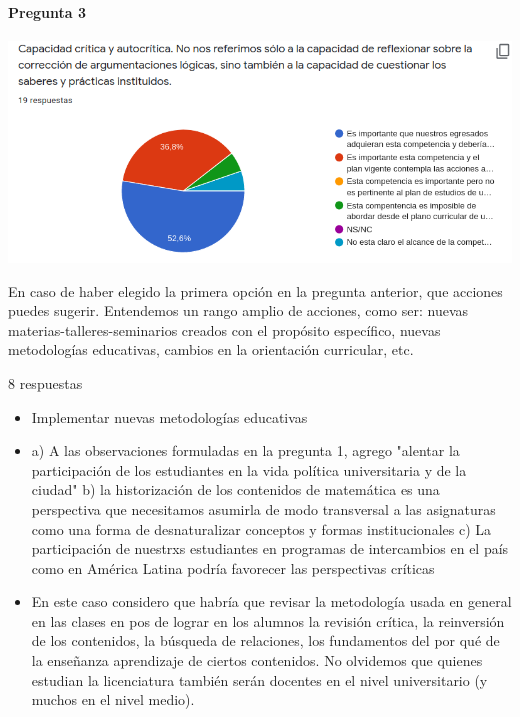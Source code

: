 \documentclass[a4paper,10pt,BCOR10mm,oneside,headsepline]{scrbook}
\begin{document}
\begin{subappendices}
\paragraph{Pregunta 3}
\begin{center}
 
\includegraphics[scale=.9]{doc03.png}
 \end{center}

 
 En caso de haber elegido la primera opción en la pregunta anterior, que acciones puedes sugerir. Entendemos un rango amplio de acciones, como ser: nuevas materias-talleres-seminarios creados con el propósito específico, nuevas metodologías educativas, cambios en la orientación curricular, etc. 
 
 8 respuestas
 
\begin{itemize} 
\item Implementar nuevas metodologías educativas 

\item a) A las observaciones formuladas en la pregunta 1,  agrego "alentar la participación de los estudiantes en la vida política universitaria y de la ciudad" b) la historización de los contenidos de matemática es una perspectiva que necesitamos asumirla de modo transversal a las asignaturas como una forma de desnaturalizar conceptos y formas institucionales c) La participación de nuestrxs estudiantes en programas de intercambios en el país como en América Latina podría favorecer las perspectivas críticas

\item En este caso considero que habría que revisar la metodología usada en general en las clases en pos de lograr en los alumnos la revisión crítica, la reinversión de los contenidos, la búsqueda de relaciones, los fundamentos del por qué de la enseñanza aprendizaje de ciertos contenidos. No olvidemos que quienes estudian la licenciatura también serán docentes en el nivel universitario (y muchos en el nivel medio).


\end{itemize}
\end{subappendices}
\end{document}
